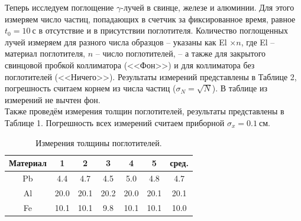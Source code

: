 \documentclass[a4paper,12pt]{article}
\begin{document}
Теперь исследуем поглощение $\gamma$-лучей в свинце, железе и алюминии. Для этого измеряем число частиц, попадающих в счетчик за фиксированное время, равное $t_0 = 10~\text{с}$ в отсутствие и в присутствии поглотителя. Количество поглощенных лучей измеряем для разного числа образцов -- указаны как El $\times n$, где El -- материал поглотителя, $n$ -- число поглотителей, -- а также для закрытого свинцовой пробкой коллиматора (<<Фон>>) и для коллиматора без поглотителей (<<Ничего>>). Результаты измерений представлены в Таблице 2, погрешность считаем корнем из числа частиц ($\sigma_N = \sqrt{N}$). В таблице из измерений не вычтен фон.\\
Также проведём измерения толщин поглотителей, результаты представлены в Таблице 1. Погрешность всех измерений считаем приборной $\sigma_x = 0.1~\text{см}$.
\begin{table}[h]
\begin{tabular}{|c|c|c|c|c|c|c|}
\hline
Материал & 1    & 2    & 3    & 4    & 5    & сред. \\ \hline
Pb       & 4.4  & 4.7  & 4.5  & 5.0  & 4.8  & 4.7   \\ \hline
Al       & 20.0 & 20.1 & 20.2 & 20.0 & 20.1 & 20.1  \\ \hline
Fe       & 10.1 & 10.1 & 9.8  & 10.1 & 10.1 & 10.0  \\ \hline
\end{tabular}
\centering
\caption{Измерения толщины поглотителей.}
\end{table}
\end{document}
